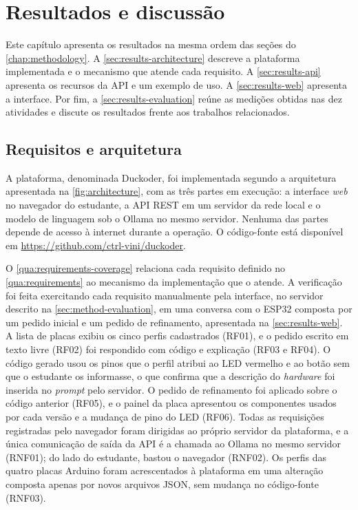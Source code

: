 %

\chapter{Resultados e discussão}
\label{chap:results}

Este capítulo apresenta os resultados na mesma ordem das seções do \autoref{chap:methodology}. A \autoref{sec:results-architecture} descreve a plataforma implementada e o mecanismo que atende cada requisito. A \autoref{sec:results-api} apresenta os recursos da API e um exemplo de uso. A \autoref{sec:results-web} apresenta a interface. Por fim, a \autoref{sec:results-evaluation} reúne as medições obtidas nas dez atividades e discute os resultados frente aos trabalhos relacionados.

\section{Requisitos e arquitetura}
\label{sec:results-architecture}

A plataforma, denominada Duckoder, foi implementada segundo a arquitetura apresentada na \autoref{fig:architecture}, com as três partes em execução: a interface \textit{web} no navegador do estudante, a API REST em um servidor da rede local e o modelo de linguagem sob o Ollama no mesmo servidor. Nenhuma das partes depende de acesso à internet durante a operação. O código-fonte está disponível em \url{https://github.com/ctrl-vini/duckoder}.

O \autoref{qua:requirements-coverage} relaciona cada requisito definido no \autoref{qua:requirements} ao mecanismo da implementação que o atende. A verificação foi feita exercitando cada requisito manualmente pela interface, no servidor descrito na \autoref{sec:method-evaluation}, em uma conversa com o ESP32 composta por um pedido inicial e um pedido de refinamento, apresentada na \autoref{sec:results-web}. A lista de placas exibiu os cinco perfis cadastrados (RF01), e o pedido escrito em texto livre (RF02) foi respondido com código e explicação (RF03 e RF04). O código gerado usou os pinos que o perfil atribui ao LED vermelho e ao botão sem que o estudante os informasse, o que confirma que a descrição do \textit{hardware} foi inserida no \textit{prompt} pelo servidor. O pedido de refinamento foi aplicado sobre o código anterior (RF05), e o painel da placa apresentou os componentes usados por cada versão e a mudança de pino do LED (RF06). Todas as requisições registradas pelo navegador foram dirigidas ao próprio servidor da plataforma, e a única comunicação de saída da API é a chamada ao Ollama no mesmo servidor (RNF01); do lado do estudante, bastou o navegador (RNF02). Os perfis das quatro placas Arduino foram acrescentados à plataforma em uma alteração composta apenas por novos arquivos JSON, sem mudança no código-fonte (RNF03).

